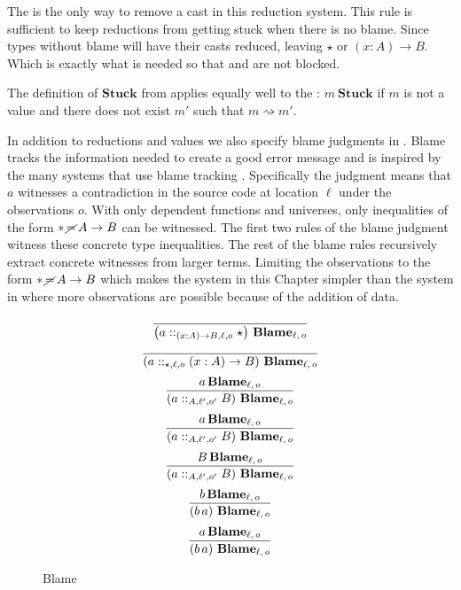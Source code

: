 The  is the only way to remove a cast in this reduction system.
This rule is sufficient to keep reductions from getting stuck when there is no blame.
Since types without blame will have their casts reduced, leaving $\star$ or $\left(x:A\right)\rightarrow B$.
Which is exactly what is needed so that  and  are not blocked.

The definition of $\textbf{Stuck}$ from  applies equally well to the \clang{}: $m\ \textbf{Stuck}$ if $m$ is not a value and there does not exist $m'$ such that $m \rightsquigarrow m'$.

In addition to reductions and values we also specify blame judgments in .
Blame tracks the information needed to create a good error message and is inspired by the many systems that use blame tracking \cite{10.1145/581478.581484,10.1007/978-3-642-00590-9_1,wadler:LIPIcs:2015:5033}.
Specifically the judgment  means that $a$ witnesses a contradiction in the source code at location $\ell$ under the observations $o$.
With only dependent functions and universes, only inequalities of the form $*\,\cancel{=}\,A\rightarrow B$ can be witnessed.
The first two rules of the blame judgment witness these concrete type inequalities.
The rest of the blame rules recursively extract concrete witnesses from larger terms.
Limiting the observations to the form $*\,\cancel{=}\,A\rightarrow B$ which makes the system in this Chapter simpler than the system in  where more observations are possible because of the addition of data.
 
\begin{figure}
\[
\frac{\,}{\left(a::_{\left(x:A\right)\rightarrow B,\ell ,o}\star\right)\,\textbf{Blame}{}_{\ell,\,o}}
\]
\[
\frac{\,}{\left(a::_{\star,\ell ,o}\left(x:A\right)\rightarrow B\right)\,\textbf{Blame}{}_{\ell,\,o}}
\]
\[
\frac{
 a\,\textbf{Blame}{}_{\ell,\,o}
}{
 \left(a::_{A,\ell',o'}B\right)\,\textbf{Blame}{}_{\ell,\,o}
}
\]
\[
\frac{
 a\,\textbf{Blame}{}_{\ell,\,o}
}{
 \left(a::_{A,\ell',o'}B\right)\,\textbf{Blame}{}_{\ell,\,o}
}
\]
\[
\frac{
 B\,\textbf{Blame}{}_{\ell,\,o}
}{
 \left(a::_{A,\ell',o'}B\right)\,\textbf{Blame}{}_{\ell,\,o}
}
\]
\[
\frac{
 b\,\textbf{Blame}{}_{\ell,\,o}
}{
 \left(b\,a\right)\,\textbf{Blame}{}_{\ell,\,o}
}
\]
\[
\frac{
 a\,\textbf{Blame}{}_{\ell,\,o}
}{
 \left(b\,a\right)\,\textbf{Blame}{}_{\ell,\,o}
}
\]
\caption{\CLang{} Blame}
\label{fig:cast-blame}
\end{figure}
 